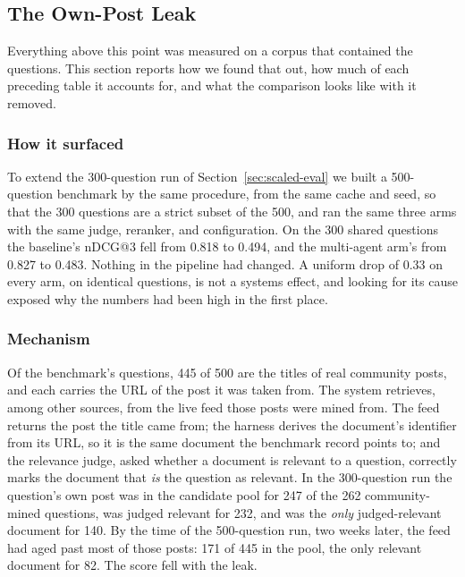 \documentclass[acmsmall,review,anonymous,screen]{acmart}
\begin{document}
\subsection{The Own-Post Leak}\label{sec:leak}

Everything above this point was measured on a corpus that contained the
questions. This section reports how we found that out, how much of each
preceding table it accounts for, and what the comparison looks like with it
removed.

\subsubsection{How it surfaced}

To extend the 300-question run of Section~\ref{sec:scaled-eval} we built a
500-question benchmark by the same procedure, from the same cache and seed, so
that the 300 questions are a strict subset of the 500, and ran the same three
arms with the same judge, reranker, and configuration. On the 300 shared
questions the baseline's nDCG@3 fell from 0.818 to 0.494, and the multi-agent
arm's from 0.827 to 0.483. Nothing in the pipeline had changed. A uniform drop of
0.33 on every arm, on identical questions, is not a systems effect, and looking
for its cause exposed why the numbers had been high in the first place.

\subsubsection{Mechanism}

Of the benchmark's questions, 445 of 500 are the titles of real community
posts, and each carries the URL of the post it was taken from. The system
retrieves, among other sources, from the live feed those posts were mined from.
The feed returns the post the title came from; the harness derives the
document's identifier from its URL, so it is the same document the benchmark
record points to; and the relevance judge, asked whether a document is relevant
to a question, correctly marks the document that \emph{is} the question as
relevant. In the 300-question run the question's own post was in the candidate
pool for 247 of the 262 community-mined questions, was judged relevant for 232,
and was the \emph{only} judged-relevant document for 140. By the time of the
500-question run, two weeks later, the feed had aged past most of those posts:
171 of 445 in the pool, the only relevant document for 82. The score fell with
the leak.
\end{document}
